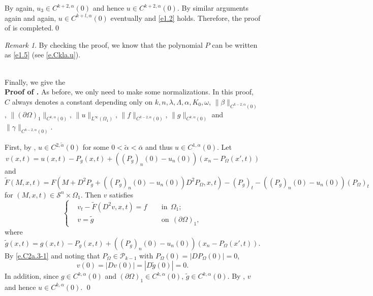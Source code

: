 \documentclass[preprint,12pt]{elsarticle}
\theoremstyle{definition}
\theoremstyle{remark}
\newtheorem{remark}[theorem]{Remark}
\numberwithin{equation}{section}
\begin{document}
By  again, $u_3\in C^{k+2,\alpha}(0)$ and hence $u\in C^{k+2,\alpha}(0)$. By similar arguments again and again, $u\in C^{k+l,\alpha}(0)$ eventually and \cref{e1.2} holds. Therefore, the proof of  is completed.\qed~\\

\begin{remark}\label{re.Ckla.1}
By checking the proof, we know that the polynomial $P$ can be written as \cref{e1.5} (see \cref{e.Ckla.u}).
\end{remark}
~\\

Finally, we give the\\
\noindent\textbf{Proof of .} As before, we only need to make some normalizations. In this proof, $C$ always denotes a constant depending only on $k, n, \lambda, \Lambda, \alpha,K_0,\omega$, $\|\beta\|_{C^{k-2,\alpha}(0)}$, $\|(\partial \Omega)_1\|_{C^{k,\alpha}(0)}$, $\|u\|_{L^{\infty}(\Omega_1)}$, $\|f\|_{C^{k-2,\alpha}(0)}$, $\|g\|_{C^{k,\alpha}(0)}$ and $\|\gamma\|_{C^{k-2,\alpha}(0)}$.

First, by , $u\in C^{2,\tilde\alpha}(0)$ for some $0<\tilde{\alpha}<\bar{\alpha}$ and thus $u\in C^{1,\alpha}(0)$. Let
\begin{equation*}
v(x,t)=u(x,t)-P_g(x,t)+((P_{g})_n(0)-u_n(0))\left(x_n-P_{\Omega}(x',t)\right)
\end{equation*}
and
\begin{equation*}
\tilde{F}(M,x,t)=F(M+D^2P_g+((P_{g})_n(0)-u_n(0))D^2P_{\Omega},x,t)-(P_{g})_t
-((P_{g})_n(0)-u_n(0))(P_{\Omega})_t
\end{equation*}
for $(M,x,t) \in \mathcal{S}^n\times \Omega_1$.
Then $v$ satisfies
\begin{equation*}
\left\{\begin{aligned}
&v_t-\tilde{F}(D^2v,x,t)=f&& ~~\mbox{in}~~\Omega_1;\\
&v=\tilde{g}&& ~~\mbox{on}~~(\partial \Omega)_1,
\end{aligned}\right.
\end{equation*}
where
\begin{equation*}
  \tilde{g}(x,t)=g(x,t)-P_g(x,t)+((P_{g})_n(0)-u_n(0))\left(x_n-P_{\Omega}(x',t)\right).
\end{equation*}
By \cref{e.C2a.3-1} and noting that $P_{\Omega}\in \mathcal{P}_{k-1}$ with $P_{\Omega}(0)=|DP_{\Omega}(0)|=0$,
\begin{equation*}
v(0)=|Dv(0)|=|D\tilde g(0)|=0.
\end{equation*}
In addition, since $g\in C^{k,\alpha}(0)$ and $(\partial \Omega)_1\in C^{k,\alpha}(0)$,
$\tilde{g}\in C^{k,\alpha}(0)$. By , $v$ and hence $u\in C^{k,\alpha}(0)$. \qed~\\
\end{document}
